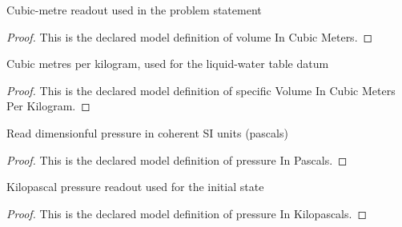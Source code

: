 \begin{definition}
  \label{def:physics:phyx-mini-0450:phyxminiproblems-problemphyxmini0450-volumeincubicmeters}
  Cubic-metre readout used in the problem statement
\end{definition}
\begin{proof}
  This is the declared model definition of volume In Cubic Meters.
\end{proof}
\begin{definition}
  \label{def:physics:phyx-mini-0450:phyxminiproblems-problemphyxmini0450-specificvolumeincubicmetersperkilogram}
  Cubic metres per kilogram, used for the liquid-water table datum
\end{definition}
\begin{proof}
  This is the declared model definition of specific Volume In Cubic Meters Per Kilogram.
\end{proof}
\begin{definition}
  \label{def:physics:phyx-mini-0450:phyxminiproblems-problemphyxmini0450-pressureinpascals}
  Read dimensionful pressure in coherent SI units (pascals)
\end{definition}
\begin{proof}
  This is the declared model definition of pressure In Pascals.
\end{proof}
\begin{definition}
  \label{def:physics:phyx-mini-0450:phyxminiproblems-problemphyxmini0450-pressureinkilopascals}
  Kilopascal pressure readout used for the initial state
\end{definition}
\begin{proof}
  This is the declared model definition of pressure In Kilopascals.
\end{proof}
